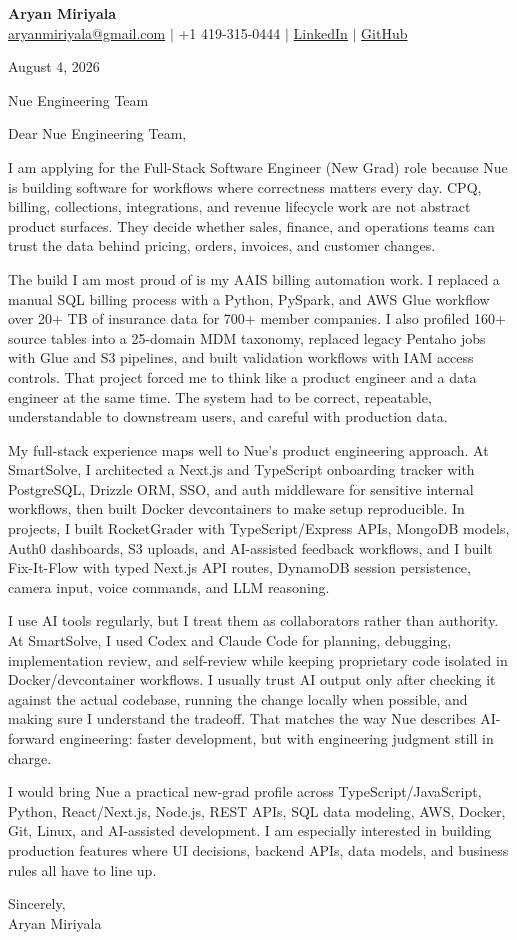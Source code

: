 \documentclass[letterpaper,11pt]{article}
\begin{document}
{\Large\textbf{Aryan Miriyala}}\\
\href{mailto:aryanmiriyala@gmail.com}{aryanmiriyala@gmail.com} $|$ +1 419-315-0444 $|$
\href{https://www.linkedin.com/in/aryan-miriyala-7788a21b6/}{LinkedIn} $|$
\href{https://github.com/aryanmiriyala}{GitHub}

August 4, 2026

Nue Engineering Team

Dear Nue Engineering Team,

I am applying for the Full-Stack Software Engineer (New Grad) role because Nue is building software for workflows where correctness matters every day. CPQ, billing, collections, integrations, and revenue lifecycle work are not abstract product surfaces. They decide whether sales, finance, and operations teams can trust the data behind pricing, orders, invoices, and customer changes.

The build I am most proud of is my AAIS billing automation work. I replaced a manual SQL billing process with a Python, PySpark, and AWS Glue workflow over 20+ TB of insurance data for 700+ member companies. I also profiled 160+ source tables into a 25-domain MDM taxonomy, replaced legacy Pentaho jobs with Glue and S3 pipelines, and built validation workflows with IAM access controls. That project forced me to think like a product engineer and a data engineer at the same time. The system had to be correct, repeatable, understandable to downstream users, and careful with production data.

My full-stack experience maps well to Nue's product engineering approach. At SmartSolve, I architected a Next.js and TypeScript onboarding tracker with PostgreSQL, Drizzle ORM, SSO, and auth middleware for sensitive internal workflows, then built Docker devcontainers to make setup reproducible. In projects, I built RocketGrader with TypeScript/Express APIs, MongoDB models, Auth0 dashboards, S3 uploads, and AI-assisted feedback workflows, and I built Fix-It-Flow with typed Next.js API routes, DynamoDB session persistence, camera input, voice commands, and LLM reasoning.

I use AI tools regularly, but I treat them as collaborators rather than authority. At SmartSolve, I used Codex and Claude Code for planning, debugging, implementation review, and self-review while keeping proprietary code isolated in Docker/devcontainer workflows. I usually trust AI output only after checking it against the actual codebase, running the change locally when possible, and making sure I understand the tradeoff. That matches the way Nue describes AI-forward engineering: faster development, but with engineering judgment still in charge.

I would bring Nue a practical new-grad profile across TypeScript/JavaScript, Python, React/Next.js, Node.js, REST APIs, SQL data modeling, AWS, Docker, Git, Linux, and AI-assisted development. I am especially interested in building production features where UI decisions, backend APIs, data models, and business rules all have to line up.

Sincerely,\\
Aryan Miriyala
\end{document}
